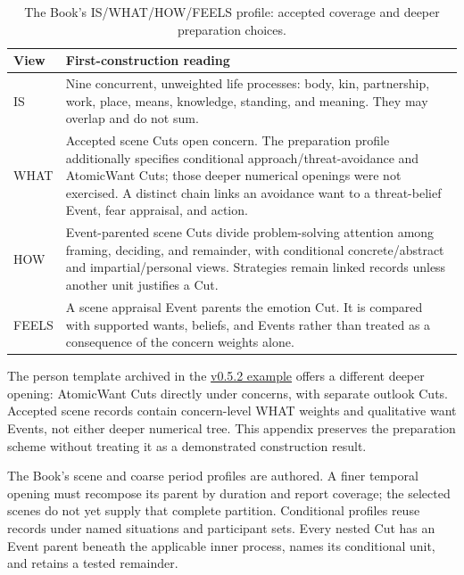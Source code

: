 \documentclass[11pt,a4paper]{article}
\begin{document}
\begin{table}[H]
\centering
\small
\begin{tabularx}{\textwidth}{@{}p{}Y@{}}
\toprule
View & First-construction reading \\
\midrule
IS & Nine concurrent, unweighted life processes: body, kin, partnership, work,
place, means, knowledge, standing, and meaning. They may overlap and do not sum. \\
WHAT & Accepted scene Cuts open concern. The preparation profile additionally
specifies conditional approach/threat-avoidance and AtomicWant Cuts; those
deeper numerical openings were not exercised. A distinct chain links an
avoidance want to a threat-belief Event, fear appraisal, and action. \\
HOW & Event-parented scene Cuts divide problem-solving attention among framing,
deciding, and remainder, with conditional concrete/abstract and
impartial/personal views. Strategies remain linked records unless another unit
justifies a Cut. \\
FEELS & A scene appraisal Event parents the emotion Cut. It is compared with
supported wants, beliefs, and Events rather than treated as a consequence of
the concern weights alone. \\
\bottomrule
\end{tabularx}
\caption{The Book's IS/WHAT/HOW/FEELS profile: accepted coverage and deeper preparation choices.}
\label{tab:book-person-profile}
\end{table}

The person template archived in the
\href{https://github.com/emergent-wisdom/meaning-model/blob/v0.5.2/examples/book-of-conditions/PERSON-TEMPLATE.md}{v0.5.2 example}
offers a different deeper opening: AtomicWant Cuts directly under concerns, with separate outlook Cuts. Accepted scene
records contain concern-level WHAT weights and qualitative want Events, not
either deeper numerical tree. This appendix preserves the preparation scheme
without treating it as a demonstrated construction result.

The Book's scene and coarse period profiles are authored. A finer temporal
opening must recompose its parent by duration and report coverage; the selected
scenes do not yet supply that complete partition. Conditional profiles reuse records under named
situations and participant sets. Every nested Cut has an Event parent beneath
the applicable inner process, names its conditional unit, and retains a tested
remainder.
\end{document}
